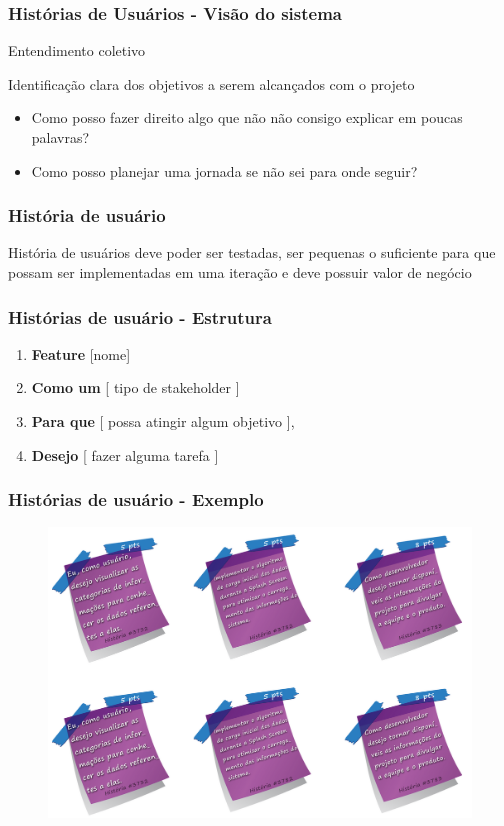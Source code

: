 \begin{frame}
 \frametitle{Histórias de Usuários - Visão do sistema}
 \begin{block}{}
  Entendimento coletivo
  
Identificação clara dos objetivos a serem alcançados com o projeto
 \end{block}
 
  \begin{block}{}
 \begin{itemize}
  \item Como posso fazer direito algo que não não consigo explicar em poucas palavras?
  \item Como posso planejar uma jornada se não sei para onde seguir?
 \end{itemize}

 \end{block}
\end{frame}

\begin{frame}
 \frametitle{História de usuário}
 \begin{block}{}
  História de usuários deve poder ser testadas, ser pequenas o suficiente para que possam ser implementadas em uma iteração e deve possuir valor de negócio
 \end{block}
\end{frame}


\begin{frame}
 \frametitle{Histórias de usuário - Estrutura}
 \begin{enumerate}
     \item \textbf{Feature} [nome]
   \item    \textbf{Como um } [ tipo de stakeholder ]
   \item    \textbf{Para que} [ possa atingir algum objetivo ],
   \item    \textbf{Desejo} [ fazer alguma tarefa ]
 \end{enumerate}
\end{frame}


\begin{frame}	
 \frametitle{Histórias de usuário - Exemplo}
  \begin{figure}
   \centering
   \includegraphics[width = \textwidth]{figs/fig7.png}
  \end{figure}
\end{frame}


